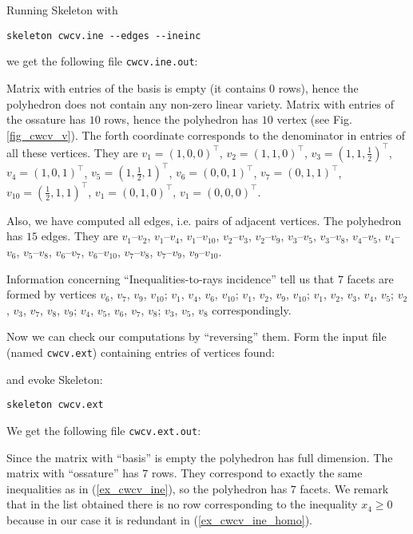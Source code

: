 \documentclass{article}
\newcommand{\Skeleton}{{\sc Skeleton}\xspace}
\newcommand{\transpose}{^{\top}}
\newcommand{\Ref}[1]{{\rm (\ref{#1})}}
\begin{document}
Running \Skeleton with
\begin{verbatim}
skeleton cwcv.ine --edges --ineinc
\end{verbatim}
we get the following file \verb$cwcv.ine.out$:


Matrix with entries of the basis is empty (it contains $0$ rows), hence
the polyhedron does not contain any non-zero linear variety.
Matrix with entries of the ossature has $10$ rows, hence the polyhedron
has $10$ vertex (see Fig.\,\ref{fig_cwcv_v}). The forth coordinate 
corresponds to the denominator in entries
of all these vertices. They are
$v_1=(1, 0, 0)\transpose$, 
$v_2=(1, 1, 0)\transpose$, 
$v_3=(1, 1, \frac{1}{2})\transpose$, 
$v_4=(1, 0, 1)\transpose$, 
$v_5=(1, \frac{1}{2}, 1)\transpose$, 
$v_6=(0, 0, 1)\transpose$, 
$v_7=(0, 1, 1)\transpose$, 
$v_{10}=\left(\frac{1}{2}, 1, 1\right)\transpose$,
$v_1=(0, 1, 0)\transpose$, 
$v_1=(0, 0, 0)\transpose$.

Also, we have computed all edges, i.e. pairs of adjacent vertices.
The polyhedron has $15$ edges. They are
$v_1$--$v_2$,
$v_1$--$v_4$,
$v_1$--$v_{10}$,
$v_2$--$v_3$,
$v_2$--$v_9$,
$v_3$--$v_5$,
$v_3$--$v_8$,
$v_4$--$v_5$,
$v_4$--$v_6$,
$v_5$--$v_8$,
$v_6$--$v_7$,
$v_6$--$v_{10}$,
$v_7$--$v_8$,
$v_7$--$v_9$,
$v_9$--$v_{10}$.

Information concerning ``Inequalities-to-rays incidence'' tell us that $7$ facets
are formed by vertices 
$v_6$, $v_7$, $v_9$, $v_{10}$;
$v_1$, $v_4$, $v_6$, $v_{10}$;
$v_1$, $v_2$, $v_9$, $v_{10}$;
$v_1$, $v_2$, $v_3$, $v_4$, $v_5$;
$v_2$, $v_3$, $v_7$, $v_8$, $v_9$;
$v_4$, $v_5$, $v_6$, $v_7$, $v_8$;
$v_3$, $v_5$, $v_8$
correspondingly.

Now we can check our computations by ``reversing'' them.
Form the input file (named \verb$cwcv.ext$) containing
entries of vertices found:

and evoke \Skeleton:
\begin{verbatim}
skeleton cwcv.ext
\end{verbatim}
We get the following file \verb$cwcv.ext.out$:

Since the matrix with ``basis'' is empty the polyhedron has full dimension.
The matrix with ``ossature'' has $7$ rows. They correspond to exactly the same
inequalities as in \Ref{ex_cwcv_ine}, so the polyhedron has $7$ facets.
We remark that in the list obtained there is no row corresponding to the inequality
$x_4 \ge 0$ because in our case it is redundant in \Ref{ex_cwcv_ine_homo}.
\end{document}
